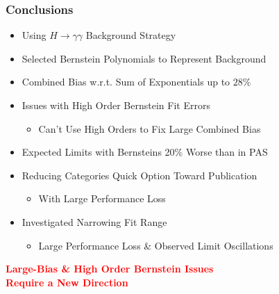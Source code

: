 \documentclass{beamer}
\newcommand{\tredbf}[1]{\textcolor{red}{\bf #1}}
\begin{document}
\begin{frame}
\frametitle{Conclusions}
  \begin{itemize}
    \item Using $H\rightarrow\gamma\gamma$ Background Strategy
    \item Selected Bernstein Polynomials to Represent Background
    \item Combined Bias w.r.t. Sum of Exponentials up to $28\%$
    \item Issues with High Order Bernstein Fit Errors
    \begin{itemize}
      \item Can't Use High Orders to Fix Large Combined Bias
    \end{itemize}
    \item Expected Limits with Bernsteins 20\% Worse than in PAS
    \item Reducing Categories Quick Option Toward Publication
    \begin{itemize}
      \item With Large Performance Loss
    \end{itemize}
    \item Investigated Narrowing Fit Range
    \begin{itemize}
      \item Large Performance Loss \& Observed Limit Oscillations
    \end{itemize}
  \end{itemize}
\begin{center}
\tredbf{
  Large-Bias \& High Order Bernstein Issues \\ Require a New Direction
}
\end{center}
\end{frame}
\end{document}
